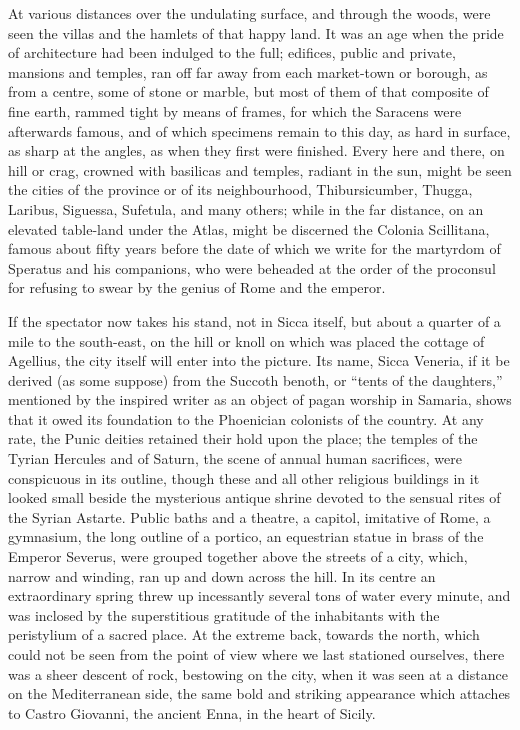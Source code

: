 At various distances over the undulating surface, and through the
woods, were seen the villas and the hamlets of that happy land. It was
an age when the pride of architecture had been indulged to the full;
edifices, public and private, mansions and temples, ran off far away
from each market-town or borough, as from a centre, some of stone or
marble, but most of them of that composite of fine earth, rammed tight
by means of frames, for which the Saracens were afterwards famous, and
of which specimens remain to this day, as hard in surface, as sharp at
the angles, as when they first were finished. Every here and there, on
hill or crag, crowned with basilicas and temples, radiant in the sun,
might be seen the cities of the province or of its neighbourhood,
Thibursicumber, Thugga, Laribus, Siguessa, Sufetula, and many others;
while in the far distance, on an elevated table-land under the
Atlas, might be discerned the Colonia Scillitana, famous about fifty
years before the date of which we write for the martyrdom of Speratus
and his companions, who were beheaded at the order of the proconsul
for refusing to swear by the genius of Rome and the emperor.

If the spectator now takes his stand, not in Sicca itself, but
about a quarter of a mile to the south-east, on the hill or knoll on
which was placed the cottage of Agellius, the city itself will enter
into the picture. Its name, Sicca Veneria, if it be derived (as some
suppose) from the Succoth benoth, or ``tents of the
daughters,'' mentioned by the inspired writer as an object of
pagan worship in Samaria, shows that it owed its foundation to the
Phoenician colonists of the country. At any rate, the Punic deities
retained their hold upon the place; the temples of the Tyrian Hercules
and of Saturn, the scene of annual human sacrifices, were conspicuous
in its outline, though these and all other religious buildings in it
looked small beside the mysterious antique shrine devoted to the
sensual rites of the Syrian Astarte. Public baths and a theatre, a
capitol, imitative of Rome, a gymnasium, the long outline of a
portico, an equestrian statue in brass of the Emperor Severus, were
grouped together above the streets of a city, which, narrow and
winding, ran up and down across the hill. In its centre an
extraordinary spring threw up incessantly several tons of water every
minute, and was inclosed by the superstitious gratitude of the
inhabitants with the peristylium of a sacred place. At the extreme
back, towards the north, which could not be seen from the point of
view where we last stationed ourselves, there was a sheer descent of
rock, bestowing on the city, when it was seen at a distance on the
Mediterranean side, the same bold and striking appearance which
attaches to Castro Giovanni, the ancient Enna, in the heart of Sicily.

